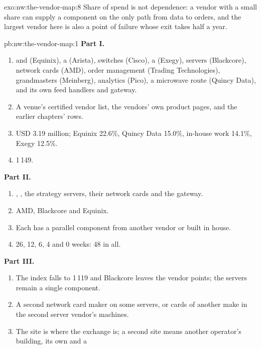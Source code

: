 \begin{solution}{exo:nw:the-vendor-map:8}
Share of spend is not dependence: a vendor with a small share can supply a component on the only path from data to orders, and the
largest vendor here is also a point of failure whose exit takes half a year.
\end{solution}

\begin{solution}{pb:nw:the-vendor-map:1}
\textbf{Part I.}
\begin{enumerate}
\item {} and  (Equinix), a  (Arista), switches (Cisco), a  (Exegy), servers
  (Blackcore), network cards (AMD), order management (Trading Technologies), grandmasters (Meinberg), analytics (Pico), a microwave route
  (Quincy Data), and its own feed handlers and gateway.
\item A venue's certified vendor list, the vendors' own product pages, and the earlier chapters' rows.
\item USD 3.19 million; Equinix 22.6\%, Quincy Data 15.0\%, in-house work 14.1\%, Exegy 12.5\%.
\item 1\,149.
\end{enumerate}
\textbf{Part II.}
\begin{enumerate}[resume]
\item {}, , the strategy servers, their network cards and the gateway.
\item AMD, Blackcore and Equinix.
\item Each has a parallel component from another vendor or built in house.
\item 26, 12, 6, 4 and 0 weeks: 48 in all.
\end{enumerate}
\textbf{Part III.}
\begin{enumerate}[resume]
\item The index falls to 1\,119 and Blackcore leaves the vendor points; the servers remain a single component.
\item A second network card maker on some servers, or cards of another make in the second server vendor's machines.
\item The  site is where the exchange is; a second site means another operator's building, its own  and a

\end{enumerate}
\end{solution}

